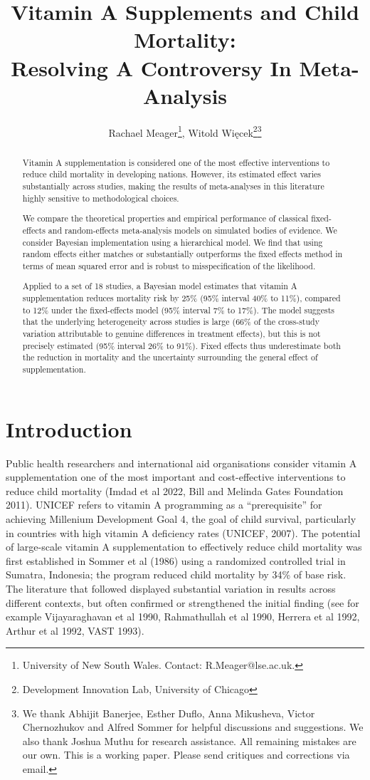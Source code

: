 \documentclass[12pt]{article}
\title{\Large Vitamin A Supplements and Child Mortality:\\ Resolving A Controversy In Meta-Analysis\\
}
\author{Rachael Meager\footnote{University of New South Wales. Contact: R.Meager@lse.ac.uk.}, Witold Więcek\footnote{Development Innovation Lab, University of Chicago}\;\thanks{We thank Abhijit Banerjee, Esther Duflo, Anna Mikusheva, Victor Chernozhukov and Alfred Sommer for helpful discussions and suggestions. We also thank Joshua Muthu for research assistance. All remaining mistakes are our own. This is a working paper. Please send critiques and corrections via email.}}
\begin{document}
\maketitle

\begin{abstract}
Vitamin A supplementation is considered one of the most effective interventions to reduce child mortality in developing nations. However, its estimated effect varies substantially across studies, making the results of meta-analyses in this literature highly sensitive to methodological choices. 

We compare the theoretical properties and empirical performance of classical fixed-effects and  random-effects meta-analysis models on simulated bodies of evidence. We consider Bayesian implementation using a hierarchical model. We find that using random effects either matches or substantially outperforms the fixed effects method in terms of mean squared error and is robust to misspecification of the likelihood. 

Applied to a set of 18 studies, a Bayesian model estimates that vitamin A supplementation reduces mortality risk by 25\% (95\% interval 40\% to 11\%), compared to 12\% under the fixed-effects model (95\% interval 7\% to 17\%). 
The model suggests that the underlying heterogeneity across studies is large (66\% of the cross-study variation attributable to genuine differences in treatment effects), but this is not precisely estimated (95\% interval 26\% to 91\%).
Fixed effects thus underestimate both the reduction in mortality and the uncertainty surrounding the general effect of supplementation. 

\end{abstract}

\section{Introduction}

Public health researchers and international aid organisations consider vitamin A supplementation one of the most important and cost-effective interventions to reduce child mortality (Imdad et al 2022, Bill and Melinda Gates Foundation 2011). UNICEF refers to vitamin A programming as a ``prerequisite'' for achieving Millenium Development Goal 4, the goal of child survival, particularly in countries with high vitamin A deficiency rates (UNICEF, 2007).  The potential of large-scale vitamin A supplementation to effectively reduce child mortality was first established in Sommer et al (1986) using a randomized controlled trial in Sumatra, Indonesia; the program reduced child mortality by 34\% of base risk. The literature that followed displayed substantial variation in results across different contexts, but often confirmed or strengthened the initial finding (see for example Vijayaraghavan et al 1990, Rahmathullah et al 1990, Herrera et al 1992, Arthur et al 1992, VAST 1993). 
\end{document}
